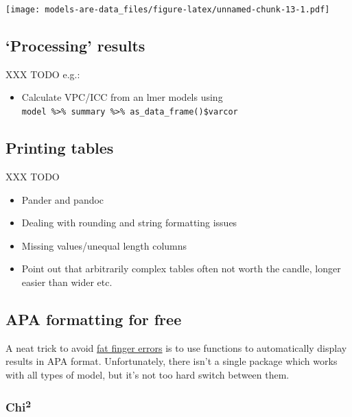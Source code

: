 \documentclass[]{article}
\providecommand{\tightlist}{%
  \setlength{\itemsep}{0pt}\setlength{\parskip}{0pt}}
\begin{document}
\texttt{[image: models-are-data\_files/figure-latex/unnamed-chunk-13-1.pdf]}

\hypertarget{process-model-results}{%
\subsection*{`Processing' results}\label{process-model-results}}

XXX TODO e.g.:

\begin{itemize}
\tightlist
\item
  Calculate VPC/ICC from an lmer models using
  \texttt{model\ \%\textgreater{}\%\ summary\ \%\textgreater{}\%\ as\_data\_frame()\$varcor}
\end{itemize}

\hypertarget{output-tables}{%
\subsection*{Printing tables}\label{output-tables}}

XXX TODO

\begin{itemize}
\tightlist
\item
  Pander and pandoc
\item
  Dealing with rounding and string formatting issues
\item
  Missing values/unequal length columns
\item
  Point out that arbitrarily complex tables often not worth the candle, longer
  easier than wider etc.
\end{itemize}

\hypertarget{apa-output}{%
\subsection*{APA formatting for free}\label{apa-output}}

A neat trick to avoid
\href{https://en.wikipedia.org/wiki/Fat-finger_error}{fat finger errors} is to use
functions to automatically display results in APA format. Unfortunately, there
isn't a single package which works with all types of model, but it's not too
hard switch between them.

\hypertarget{chi2}{%
\subsubsection*{\texorpdfstring{Chi\textsuperscript{2}}{Chi2}}\label{chi2}}
\end{document}
